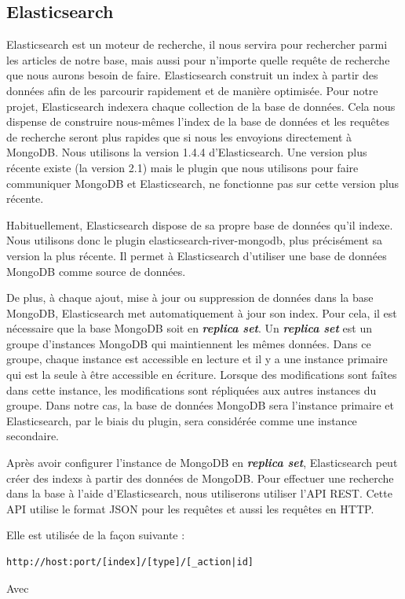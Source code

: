 \subsection{Elasticsearch}
\label{subsec:elastic}

Elasticsearch est un moteur de recherche, il nous servira pour rechercher parmi les articles de notre base, mais aussi pour n'importe quelle requête de recherche que nous aurons besoin de faire. Elasticsearch construit un index à partir des données afin de les parcourir rapidement et de manière optimisée. Pour notre projet, Elasticsearch indexera chaque collection de la base de données. Cela nous dispense de construire nous-mêmes l'index de la base de données et les requêtes de recherche seront plus rapides que si nous les envoyions directement à MongoDB. Nous utilisons la version 1.4.4 d'Elasticsearch. Une version plus récente existe (la version 2.1) mais le plugin que nous utilisons pour faire communiquer MongoDB et Elasticsearch, ne fonctionne pas sur cette version plus récente.


Habituellement, Elasticsearch dispose de sa propre base de données qu’il indexe. Nous utilisons donc le plugin elasticsearch-river-mongodb\cite{GitRiver}, plus précisément sa version la plus récente. Il permet à Elasticsearch d’utiliser une base de données MongoDB comme source de données. 


De plus, à chaque ajout, mise à jour ou suppression de données dans la base MongoDB, Elasticsearch met automatiquement à jour son index. Pour cela, il est nécessaire que la base MongoDB soit en \textbf{\textit{replica set}}.  Un \textbf{\textit{replica set}} est un groupe d’instances MongoDB qui maintiennent les mêmes données. Dans ce groupe, chaque instance est accessible en lecture et il y a une instance primaire qui est la seule à être accessible en écriture. Lorsque des modifications sont faîtes dans cette instance, les modifications sont répliquées aux autres instances du groupe. Dans notre cas, la base de données MongoDB sera l’instance primaire et Elasticsearch, par le biais du plugin, sera considérée comme une instance secondaire. 

Après avoir configurer l'instance de MongoDB en \textbf{\textit{replica set}}, Elasticsearch peut créer des indexs à partir des données de MongoDB.
Pour effectuer une recherche dans la base à l’aide d’Elasticsearch, nous utiliserons utiliser l’API REST. Cette API utilise le format JSON pour les requêtes et aussi les requêtes en HTTP.


Elle est utilisée de la façon suivante :
\begin{verbatim}
http://host:port/[index]/[type]/[_action|id]
\end{verbatim}
Avec

